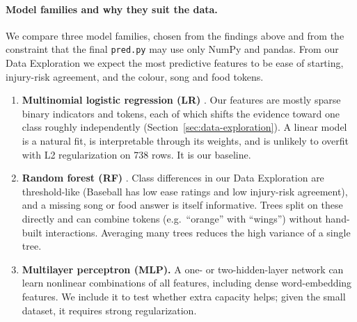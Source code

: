 \documentclass[11pt,letterpaper]{article}
\begin{document}
\paragraph{Model families and why they suit the data.}
We compare three model families, chosen from the findings above and from the
constraint that the final \texttt{pred.py} may use only NumPy and pandas. From our
Data Exploration we expect the most predictive features to be ease of starting,
injury-risk agreement, and the colour, song and food tokens.
\begin{enumerate}
\item \textbf{Multinomial logistic regression (LR)} \cite{bishop2006}. Our features
are mostly sparse binary indicators and tokens, each of which shifts the evidence
toward one class roughly independently (Section~\ref{sec:data-exploration}). A
linear model is a natural fit, is interpretable through its weights, and is
unlikely to overfit with L2 regularization on 738 rows. It is our baseline.
\item \textbf{Random forest (RF)} \cite{hastie2009}. Class differences in our Data
Exploration are threshold-like (Baseball has low ease ratings and low injury-risk
agreement), and a missing song or food answer is itself informative. Trees split
on these directly and can combine tokens (e.g.\ ``orange'' with ``wings'') without
hand-built interactions. Averaging many trees reduces the high variance of a
single tree.
\item \textbf{Multilayer perceptron (MLP).} A one- or two-hidden-layer network can
learn nonlinear combinations of all features, including dense word-embedding
features. We include it to test whether extra capacity helps; given the small
dataset, it requires strong regularization.
\end{enumerate}
\end{document}
